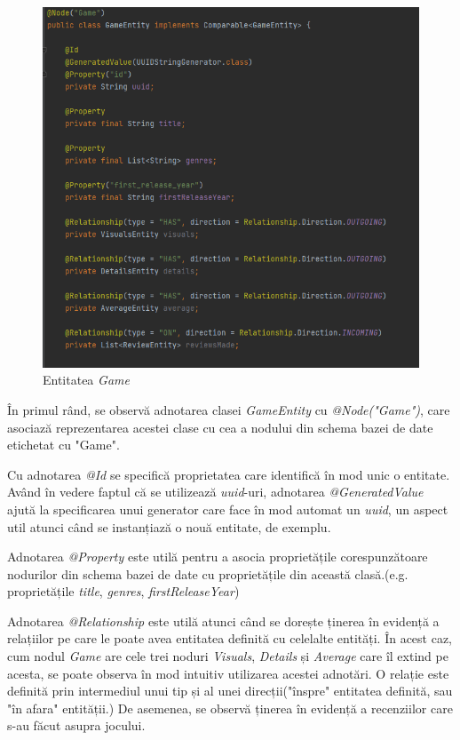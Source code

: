 \documentclass[12pt,a4paper]{report}
\begin{document}
\begin{figure}[H]
\centering
\caption{}
\includegraphics[scale = 0.8]{exemplu_18_adnotari}
\caption*{Entitatea \emph{Game}}
\end{figure}

În primul rând, se observă adnotarea clasei \emph{GameEntity} cu \emph{@Node("Game")}, care asociază reprezentarea acestei clase cu cea a nodului din schema bazei de date etichetat cu "Game".

Cu adnotarea \emph{@Id} se specifică proprietatea care identifică în mod unic o entitate. Având în vedere faptul că se utilizează \emph{uuid}-uri, adnotarea \emph{@GeneratedValue} ajută la specificarea unui generator care face în mod automat un \emph{uuid}, un aspect util atunci când se instanțiază o nouă entitate, de exemplu.

Adnotarea \emph{@Property} este utilă pentru a asocia proprietățile corespunzătoare nodurilor din schema bazei de date cu proprietățile din această clasă.(e.g. proprietățile \emph{title}, \emph{genres}, \emph{firstReleaseYear})

Adnotarea \emph{@Relationship} este utilă atunci când se dorește ținerea în evidență a relațiilor pe care le poate avea entitatea definită cu celelalte entități. În acest caz, cum nodul \emph{Game} are cele trei noduri \emph{Visuals}, \emph{Details} și \emph{Average} care îl extind pe acesta, se poate observa în mod intuitiv utilizarea acestei adnotări. O relație este definită prin intermediul unui tip și al unei direcții("înspre" entitatea definită, sau "în afara" entității.) De asemenea, se observă ținerea în evidență a recenziilor care s-au făcut asupra jocului.
\end{document}

